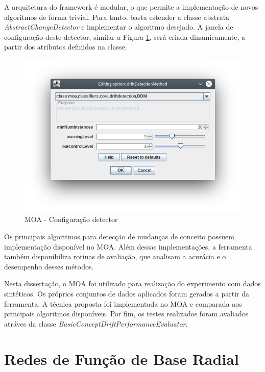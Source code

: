 \documentclass[msc, classic, a4paper]{ufbathesis}
\begin{document}
A arquitetura do framework é modular, o que permite a implementação de novos algoritmos de forma trivial.
Para tanto, basta estender a classe abstrata \textit{AbstractChangeDetector} e implementar o algoritmo desejado.
A janela de configuração deste detector, similar a Figura \ref{fig:moa_detector}, será criada dinamicamente, a partir dos atributos definidos na classe.

\begin{figure}[H]
\begin{center}
    \includegraphics[scale=1]{imagens/detector.png}
    \caption{MOA - Configuração detector}
    \label{fig:moa_detector}
\end{center}
\end{figure}

Os principais algoritmos para detecção de mudanças de conceito possuem implementação disponível no MOA.
Além dessas implementações, a ferramenta também disponibiliza rotinas de avaliação, que analisam a acurácia e o desempenho desses métodos.

Nesta dissertação, o MOA foi utilizado para realização do experimento com dados sintéticos.
Os próprios conjuntos de dados aplicados foram gerados a partir da ferramenta.
A técnica proposta foi implementada no MOA e comparada aos principais algoritmos disponíveis.
Por fim, os testes realizados foram avaliados atráves da classe \textit{BasicConceptDriftPerformanceEvaluator}.

\section{Redes de Função de Base Radial}
\end{document}
